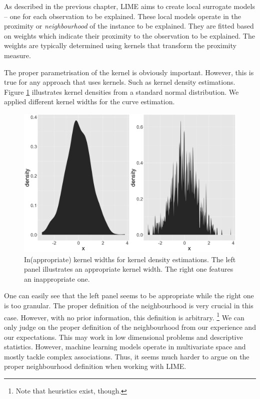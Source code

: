 \documentclass[]{krantz}
\begin{document}
As described in the previous chapter, LIME aims to create local
surrogate models -- one for each observation to be explained. These
local models operate in the proximity or \emph{neighbourhood} of the
instance to be explained. They are fitted based on weights which
indicate their proximity to the observation to be explained. The weights
are typically determined using kernels that transform the proximity
measure.

The proper parametrisation of the kernel is obviously important.
However, this is true for any approach that uses kernels. Such as kernel
density estimations. Figure \ref{fig:lime-fig1} illustrates kernel
densities from a standard normal distribution. We applied different
kernel widths for the curve estimation.

\begin{figure}

{\centering \includegraphics[width=0.99\linewidth]{images/04-09-01} 

}

\caption{In(appropriate) kernel widths for kernel density estimations. The left panel illustrates an appropriate kernel width. The right one features an inappropriate one.}\label{fig:lime-fig1}
\end{figure}

One can easily see that the left panel seems to be appropriate while the
right one is too granular. The proper definition of the neighbourhood is
very crucial in this case. However, with no prior information, this
definition is arbitrary. \footnote{Note that heuristics exist, though.}
We can only judge on the proper definition of the neighbourhood from our
experience and our expectations. This may work in low dimensional
problems and descriptive statistics. However, machine learning models
operate in multivariate space and mostly tackle complex associations.
Thus, it seems much harder to argue on the proper neighbourhood
definition when working with LIME.
\end{document}

